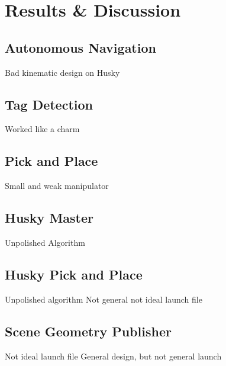 \chapter{Results \& Discussion}

\section{Autonomous Navigation}
Bad kinematic design on Husky

\section{Tag Detection}
Worked like a charm

\section{Pick and Place}
Small and weak manipulator

\section{Husky Master}
 Unpolished Algorithm

 \section{Husky Pick and Place}
 Unpolished algorithm
 Not general
 not ideal launch file

 \section{Scene Geometry Publisher}
 Not ideal launch file
 General design, but not general launch